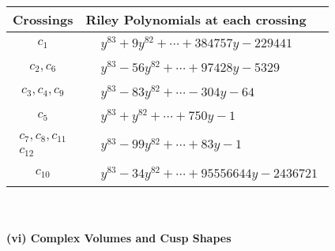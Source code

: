 \documentclass[1p]{elsarticle_modified}
\theoremstyle{definition}
\begin{document}
\begin{tabular}{m{50pt}|m{274pt}}
Crossings & \hspace{64pt}Riley Polynomials at each crossing \\
\hline $$\begin{aligned}c_{1}\end{aligned}$$&$\begin{aligned}
&y^{83}+9 y^{82}+\cdots+384757 y-229441
\end{aligned}$\\
\hline $$\begin{aligned}c_{2},c_{6}\end{aligned}$$&$\begin{aligned}
&y^{83}-56 y^{82}+\cdots+97428 y-5329
\end{aligned}$\\
\hline $$\begin{aligned}c_{3},c_{4},c_{9}\end{aligned}$$&$\begin{aligned}
&y^{83}-83 y^{82}+\cdots-304 y-64
\end{aligned}$\\
\hline $$\begin{aligned}c_{5}\end{aligned}$$&$\begin{aligned}
&y^{83}+y^{82}+\cdots+750 y-1
\end{aligned}$\\
\hline $$\begin{aligned}c_{7},c_{8},c_{11}\\c_{12}\end{aligned}$$&$\begin{aligned}
&y^{83}-99 y^{82}+\cdots+83 y-1
\end{aligned}$\\
\hline $$\begin{aligned}c_{10}\end{aligned}$$&$\begin{aligned}
&y^{83}-34 y^{82}+\cdots+95556644 y-2436721
\end{aligned}$\\
\hline
\end{tabular}\\~\\
\newpage\flushleft \textbf{(vi) Complex Volumes and Cusp Shapes}
\end{document}

